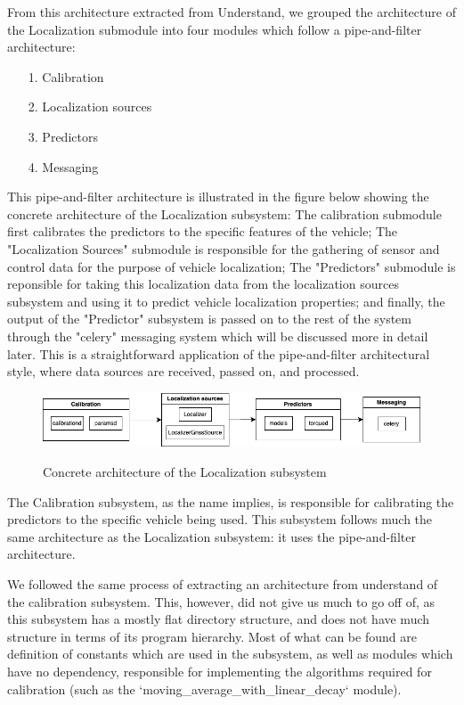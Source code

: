 \documentclass[12pt]{article}
\begin{document}
From this architecture extracted from Understand, we grouped the architecture of the Localization submodule into four modules which follow a pipe-and-filter architecture:
\begin{itemize}
    \item[1.] Calibration
    \item[2.] Localization sources
    \item[3.] Predictors
    \item[4.] Messaging
\end{itemize}

This pipe-and-filter architecture is illustrated in the figure below showing the concrete architecture of the Localization subsystem: The calibration submodule first calibrates the predictors to the specific features of the vehicle; The "Localization Sources" submodule is responsible for the gathering of sensor and control data for the purpose of vehicle localization; The "Predictors" submodule is reponsible for taking this localization data from the localization sources subsystem and using it to predict vehicle localization properties; and finally, the output of the "Predictor" subsystem is passed on to the rest of the system through the "celery" messaging system which will be discussed more in detail later. This is a straightforward application of the pipe-and-filter architectural style, where data sources are received, passed on, and processed.
\begin{figure}[H]
    \centering
    \includegraphics[scale=0.5]{concrete-architecture-localization.png}\\
    \caption{Concrete architecture of the Localization subsystem}
    \label{fig:enter-label}
\end{figure}

The Calibration subsystem, as the name implies, is responsible for calibrating the predictors to the specific vehicle being used. This subsystem follows much the same architecture as the Localization subsystem: it uses the pipe-and-filter architecture.

We followed the same process of extracting an architecture from understand of the calibration subsystem. This, however, did not give us much to go off of, as this subsystem has a mostly flat directory structure, and does not have much structure in terms of its program hierarchy. Most of what can be found are definition of constants which are used in the subsystem, as well as modules which have no dependency, responsible for implementing the algorithms required for calibration (such as the `moving\_average\_with\_linear\_decay` module). 
\end{document}
